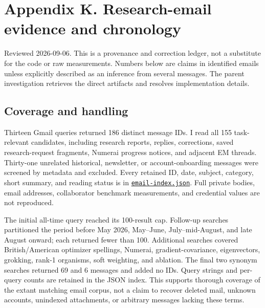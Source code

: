 \documentclass[
  british,
  10pt,
  a4paper,
]{article}
\begin{document}
\clearpage

\section{\texorpdfstring{Appendix K. Research-\allowbreak{}email
evidence and
chronology}{Appendix K.  evidence and chronology}}\label{email-evidence}

Reviewed 2026-\allowbreak{}09-\allowbreak{}06.\allowbreak{} This is a
provenance and correction ledger, not a substitute for the code or raw
measurements\allowbreak{}.\allowbreak{} Numbers below are claims in
identified emails unless explicitly described as an inference from
several messages. The parent investigation retrieves the direct
artifacts and resolves implementation details.

\subsection{Coverage and
handling}\label{email-evidence--coverage-and-handling}

Thirteen Gmail queries returned 186 distinct message IDs. I read all 155
task-\allowbreak{}relevant candidates,\allowbreak{} including research
reports, replies, corrections,\allowbreak{} saved
research-\allowbreak{}request fragments, Numerai progress notices, and
adjacent EM threads. Thirty-one unrelated historical,\allowbreak{}
newsletter,\allowbreak{} or account-\allowbreak{}onboarding messages
were screened by metadata and excluded. Every retained ID, date,
subject, category, short summary, and reading status is in
\href{../sources/email-index.json}{\texttt{email-\allowbreak{}index.\allowbreak{}json}}.
Full private bodies, email addresses, collaborator benchmark
measurements\allowbreak{},\allowbreak{} and credential values are not
reproduced.\allowbreak{}

The initial all-time query reached its 100-result cap. Follow-up
searches partitioned the period before May 2026, May--June,
July–mid-\allowbreak{}August,\allowbreak{} and late August onward; each
returned fewer than 100. Additional searches covered
British/\allowbreak{}American optimizer spellings, Numerai,
gradient-\allowbreak{}covariance,\allowbreak{}
eigenvectors\allowbreak{},\allowbreak{} grokking, rank-1 organisms, soft
weighting, and ablation. The final two synonym searches returned 69 and
6 messages and added no IDs. Query strings and per-query counts are
retained in the JSON index. This supports thorough coverage of the
extant matching email corpus, not a claim to recover deleted mail,
unknown accounts, unindexed attachments,\allowbreak{} or arbitrary
messages lacking these terms.
\end{document}
